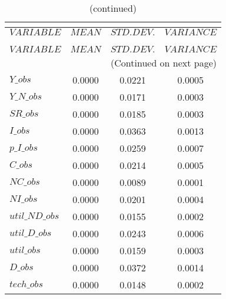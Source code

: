  
\begin{center}
\begin{longtable}{lccc} 
\caption{THEORETICAL MOMENTS}\\
 \label{Table:th_moments}\\
\toprule 
$VARIABLE       $	 & 	 $         MEAN$	 & 	 $    STD. DEV.$	 & 	 $     VARIANCE$\\
\midrule \endfirsthead 
\caption{(continued)}\\
 \toprule \\ 
$VARIABLE       $	 & 	 $         MEAN$	 & 	 $    STD. DEV.$	 & 	 $     VARIANCE$\\
\midrule \endhead 
\midrule \multicolumn{4}{r}{(Continued on next page)} \\ \bottomrule \endfoot 
\bottomrule \endlastfoot 
$Y\_obs         $	 & 	       0.0000	 & 	       0.0221	 & 	       0.0005 \\ 
$Y\_N\_obs      $	 & 	       0.0000	 & 	       0.0171	 & 	       0.0003 \\ 
$SR\_obs        $	 & 	       0.0000	 & 	       0.0185	 & 	       0.0003 \\ 
$I\_obs         $	 & 	       0.0000	 & 	       0.0363	 & 	       0.0013 \\ 
$p\_I\_obs      $	 & 	       0.0000	 & 	       0.0259	 & 	       0.0007 \\ 
$C\_obs         $	 & 	       0.0000	 & 	       0.0214	 & 	       0.0005 \\ 
$NC\_obs        $	 & 	       0.0000	 & 	       0.0089	 & 	       0.0001 \\ 
$NI\_obs        $	 & 	       0.0000	 & 	       0.0201	 & 	       0.0004 \\ 
$util\_ND\_obs  $	 & 	       0.0000	 & 	       0.0155	 & 	       0.0002 \\ 
$util\_D\_obs   $	 & 	       0.0000	 & 	       0.0243	 & 	       0.0006 \\ 
$util\_obs      $	 & 	       0.0000	 & 	       0.0159	 & 	       0.0003 \\ 
$D\_obs         $	 & 	       0.0000	 & 	       0.0372	 & 	       0.0014 \\ 
$tech\_obs      $	 & 	       0.0000	 & 	       0.0148	 & 	       0.0002 \\ 
\end{longtable}
 \end{center}
